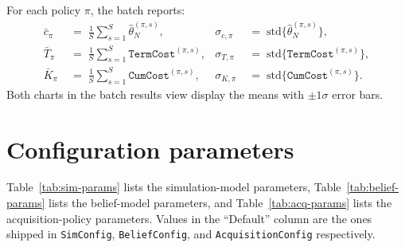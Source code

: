 \documentclass[11pt]{article}
\newcommand{\Cstar}{\theta}
\newcommand{\code}[1]{\texttt{#1}}
\begin{document}
For each policy $\pi$, the batch reports:
\begin{align*}
  \bar{c}_\pi &\;=\; \tfrac{1}{S} \textstyle\sum_{s=1}^S \widehat{\Cstar}_{N}^{(\pi,s)},
  &
  \sigma_{c,\pi} &\;=\; \mathrm{std}\bigl\{\widehat{\Cstar}_{N}^{(\pi,s)}\bigr\}, \\
  \bar{T}_\pi &\;=\; \tfrac{1}{S} \textstyle\sum_{s=1}^S \code{TermCost}^{(\pi,s)},
  &
  \sigma_{T,\pi} &\;=\; \mathrm{std}\bigl\{\code{TermCost}^{(\pi,s)}\bigr\}, \\
  \bar{K}_\pi &\;=\; \tfrac{1}{S} \textstyle\sum_{s=1}^S \code{CumCost}^{(\pi,s)},
  &
  \sigma_{K,\pi} &\;=\; \mathrm{std}\bigl\{\code{CumCost}^{(\pi,s)}\bigr\}.
\end{align*}
Both charts in the batch results view display the means with $\pm 1
\sigma$ error bars.

\section{Configuration parameters}
\label{sec:params}

Table~\ref{tab:sim-params} lists the simulation-model parameters,
Table~\ref{tab:belief-params} lists the belief-model parameters, and
Table~\ref{tab:acq-params} lists the acquisition-policy parameters. Values
in the ``Default'' column are the ones shipped in \code{SimConfig},
\code{BeliefConfig}, and \code{AcquisitionConfig} respectively.
\end{document}
